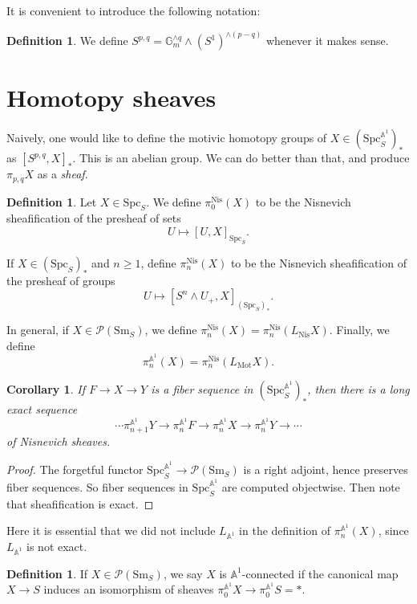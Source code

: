 \documentclass{shortart}
\newtheorem{cor}[thm]{Corollary}
\theoremstyle{definition}
\newtheorem{defi}[thm]{Definition}
\newcommand\Sm{\mathrm{Sm}}
\newcommand\Spc{\mathrm{Spc}}
\newcommand\Nis{\mathrm{Nis}}
\newcommand\Pre{\mathcal{P}}
\newcommand\A{\mathbb{A}}
\newcommand\G{\mathbb{G}}
\newcommand\Mot{\mathrm{Mot}}
\begin{document}
It is convenient to introduce the following notation:
\begin{defi}
  We define $S^{p, q} = \G_m^{\wedge q} \wedge (S^1)^{\wedge (p - q)}$ whenever it makes sense.
\end{defi}

\section{Homotopy sheaves}\label{chapter:homotopy-sheaves}
Naively, one would like to define the motivic homotopy groups of $X \in (\Spc_S^{\A^1})_*$ as $[S^{p, q}, X]_*$. This is an abelian group. We can do better than that, and produce $\pi_{p, q} X$ as a \emph{sheaf}.

\begin{defi}
  Let $X \in \Spc_S$. We define $\pi_0^{\Nis}(X)$ to be the Nisnevich sheafification of the presheaf of sets
  \[
    U \mapsto [U, X]_{\Spc_S}.
  \]

  If $X \in (\Spc_S)_*$ and $n \geq 1$, define $\pi_n^{\Nis}(X)$ to be the Nisnevich sheafification of the presheaf of groups
  \[
    U \mapsto [S^n \wedge U_+, X]_{(\Spc_S)_*}.
  \]

  In general, if $X \in \Pre(\Sm_S)$, we define $\pi_n^{\Nis}(X) = \pi_n^{\Nis}(L_{\Nis} X)$. Finally, we define
  \[
    \pi_n^{\A^1}(X) = \pi_n^{\Nis}(L_{\Mot}X).
  \]
\end{defi}

\begin{cor}
  If $F \to X \to Y$ is a fiber sequence in $(\Spc_S^{\A^1})_*$, then there is a long exact sequence
  \[
    \cdots \pi_{n + 1}^{\A^1} Y \to \pi_n^{\A^1} F \to \pi_n^{\A^1} X \to \pi_n^{\A^1} Y \to \cdots
  \]
  of Nisnevich sheaves.
\end{cor}

\begin{proof}
  The forgetful functor $\Spc_S^{\A^1} \to \Pre(\Sm_S)$ is a right adjoint, hence preserves fiber sequences. So fiber sequences in $\Spc_S^{\A^1}$ are computed objectwise. Then note that sheafification is exact.
\end{proof}
Here it is essential that we did not include $L_{\A^1}$ in the definition of $\pi_n^{\A^1}(X)$, since $L_{\A^1}$ is not exact.

\begin{defi}
  If $X \in \Pre(\Sm_S)$, we say $X$ is $\A^1$-connected if the canonical map $X \to S$ induces an isomorphism of sheaves $\pi_0^{\A^1} X \to \pi_0^{\A^1} S = *$.
\end{defi}
\end{document}
